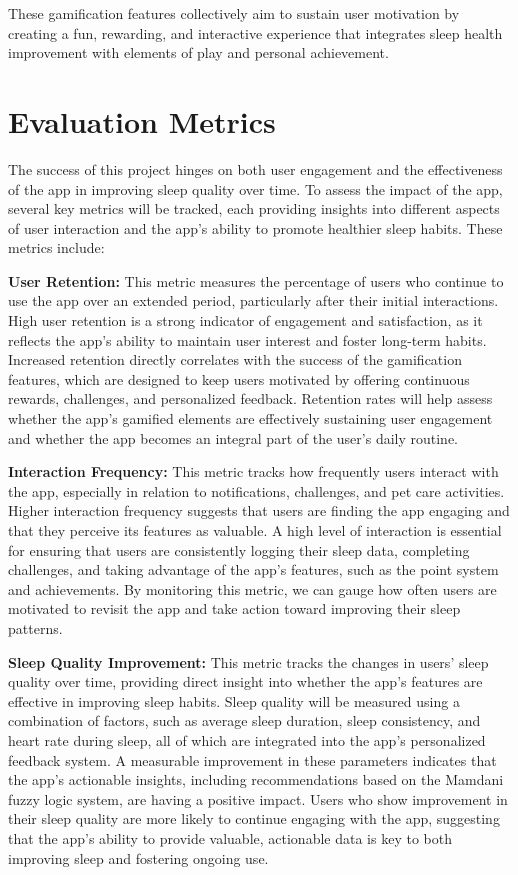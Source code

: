 \documentclass[10pt,twocolumn]{article}
\begin{document}
These gamification features collectively aim to sustain user motivation by creating a fun, rewarding, and interactive experience that integrates sleep health improvement with elements of play and personal achievement.


\section{Evaluation Metrics}

The success of this project hinges on both user engagement and the effectiveness of the app in improving sleep quality over time. To assess the impact of the app, several key metrics will be tracked, each providing insights into different aspects of user interaction and the app's ability to promote healthier sleep habits. These metrics include:

\textbf{User Retention:} This metric measures the percentage of users who continue to use the app over an extended period, particularly after their initial interactions. High user retention is a strong indicator of engagement and satisfaction, as it reflects the app's ability to maintain user interest and foster long-term habits. Increased retention directly correlates with the success of the gamification features, which are designed to keep users motivated by offering continuous rewards, challenges, and personalized feedback. Retention rates will help assess whether the app's gamified elements are effectively sustaining user engagement and whether the app becomes an integral part of the user's daily routine.

\textbf{Interaction Frequency:} This metric tracks how frequently users interact with the app, especially in relation to notifications, challenges, and pet care activities. Higher interaction frequency suggests that users are finding the app engaging and that they perceive its features as valuable. A high level of interaction is essential for ensuring that users are consistently logging their sleep data, completing challenges, and taking advantage of the app’s features, such as the point system and achievements. By monitoring this metric, we can gauge how often users are motivated to revisit the app and take action toward improving their sleep patterns.

\textbf{Sleep Quality Improvement:} This metric tracks the changes in users' sleep quality over time, providing direct insight into whether the app's features are effective in improving sleep habits. Sleep quality will be measured using a combination of factors, such as average sleep duration, sleep consistency, and heart rate during sleep, all of which are integrated into the app’s personalized feedback system. A measurable improvement in these parameters indicates that the app’s actionable insights, including recommendations based on the Mamdani fuzzy logic system, are having a positive impact. Users who show improvement in their sleep quality are more likely to continue engaging with the app, suggesting that the app’s ability to provide valuable, actionable data is key to both improving sleep and fostering ongoing use.
\end{document}
